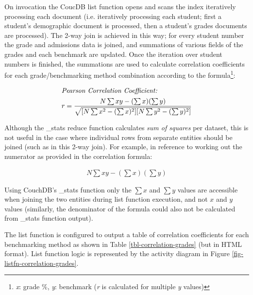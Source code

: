 On invocation the CoucDB list function opens and scans the index iteratively processing each document (i.e. iteratively processing each student; first a student's demographic document is processed, then a student's grades documents are processed). The 2-way join is achieved in this way; for every student number the grade and admissions data is joined, and summations of various fields of the grades and each benchmark are updated. Once the iteration over student numbers is finished, the summations are used to calculate correlation coefficients for each grade/benchmarking method combination according to the formula\footnote{\textit{x}: grade \%, \textit{y}: benchmark (\textit{r} is calculated for multiple \textit{y} values)}: \begin{spreadlines}{15pt}
    \begin{gather*}
        \intertext{\textit{Pearson Correlation Coefficient:}}
        r = \frac{N\sum{xy} - (\sum{x})(\sum{y})}{\sqrt{[N\sum{x^2} - (\sum{x})^2][N\sum{y^2} - (\sum{y})^2]}}
    \end{gather*}
\end{spreadlines}

Although the \_stats reduce function calculates \textit{sum of squares} per dataset, this is not useful in the case where individual rows from separate entities should be joined (such as in this 2-way join). For example, in reference to working out the numerator as provided in the correlation formula: \begin{spreadlines}{15pt}
    \begin{gather*}
        N\sum{xy} - (\sum{x})(\sum{y})
    \end{gather*}
\end{spreadlines}

Using CouchDB's \_stats function only the $\sum{x}$ and $\sum{y}$ values are accessible when joining the two entities during list function execution, and not $x$ and $y$ values (similarly, the denominator of the formula could also not be calculated from \_stats function output).

The list function is configured to output a table of correlation coefficients for each benchmarking method as shown in Table \ref{tbl-correlation-grades} (but in HTML format). List function logic is represented by the activity diagram in Figure \ref{fig-listfn-correlation-grades}.


